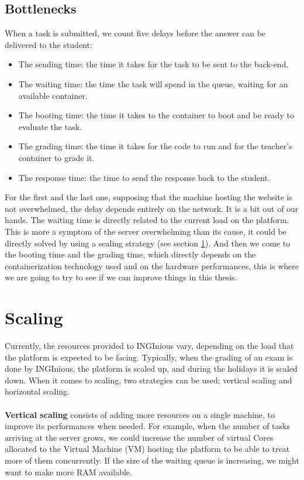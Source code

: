 \subsection{Bottlenecks}
When a task is submitted, we count five delays before the answer can be delivered to the student:
\begin{itemize}
  \item The sending time: the time it takes for the task to be sent to the back-end.
  \item The waiting time: the time the task will spend in the queue, waiting for an available container.
  \item The booting time: the time it takes to the container to boot and be ready to evaluate the task.
  \item The grading time: the time it takes for the code to run and for the teacher's container to grade it.
  \item The response time: the time to send the response back to the student.
\end{itemize}
For the first and the last one, supposing that the machine hosting the website is not overwhelmed, the delay depends entirely on the network. It is a bit out of our hands.  The waiting time is directly related to the current load on the platform. This is more a symptom of the server overwhelming than its cause, it could be directly solved by using a scaling strategy (see section \ref{section:scaling}).  And then we come to the booting time and the grading time, which directly depends on the containerization technology used and on the hardware performances, this is where we are going to try to see if we can improve things in this thesis.

\section{Scaling} \label{section:scaling}
Currently, the resources provided to INGInious vary, depending on the load that the platform is expected to be facing.  Typically, when the grading of an exam is done by INGInious, the platform is scaled up, and during the holidays it is scaled down.  When it comes to scaling, two strategies can be used; vertical scaling and horizontal scaling.

\paragraph{} \textbf{Vertical scaling} consists of adding more resources on a single machine, to improve its performances when needed.  For example, when the number of tasks arriving at the server grows, we could increase the number of virtual Cores allocated to the Virtual Machine (VM) hosting the platform to be able to treat more of them concurrently.  If the size of the waiting queue is increasing, we might want to make more RAM available.

